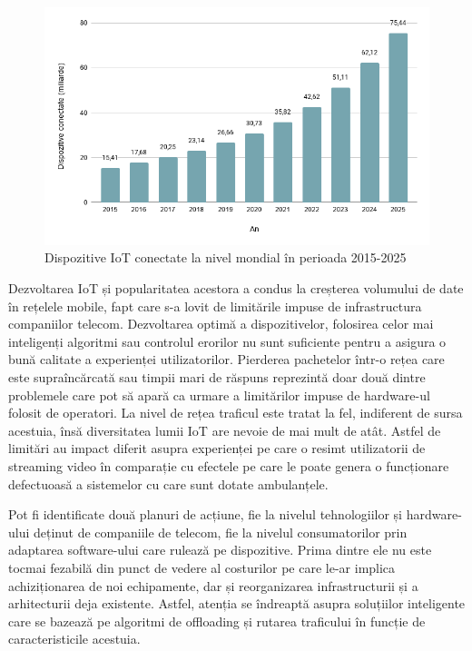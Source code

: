\documentclass[12pt,a4paper]{report}
\begin{document}
\begin{figure}[th]
\centering
\includegraphics[width=\textwidth]{img/IoT_forecast.png}
\caption{Dispozitive IoT conectate la nivel mondial în perioada 2015-2025~\cite{statisca_Iot_forecast}\protect}
\label{fig:IoT_forescat}
\end{figure}

Dezvoltarea IoT și popularitatea acestora a condus la creșterea volumului de date în rețelele mobile, fapt care s-a lovit de limitările impuse de infrastructura companiilor telecom. Dezvoltarea optimă a dispozitivelor, folosirea celor mai inteligenți algoritmi sau controlul erorilor nu sunt suficiente pentru a asigura o bună calitate a experienței utilizatorilor. Pierderea pachetelor într-o rețea care este supraîncărcată sau timpii mari de răspuns reprezintă doar două dintre problemele care pot să apară ca urmare a limitărilor impuse de hardware-ul folosit de operatori. La nivel de rețea traficul este tratat la fel, indiferent de sursa acestuia, însă diversitatea lumii IoT are nevoie de mai mult de atât. Astfel de limitări au impact diferit asupra experienței pe care o resimt utilizatorii de streaming video în comparație cu efectele pe care le poate genera o funcționare defectuoasă a sistemelor cu care sunt dotate ambulanțele.

Pot fi identificate două planuri de acțiune, fie la nivelul tehnologiilor și hardware-ului deținut de companiile de telecom, fie la nivelul consumatorilor prin adaptarea software-ului care rulează pe dispozitive. Prima dintre ele nu este tocmai fezabilă din punct de vedere al costurilor pe care le-ar implica achiziționarea de noi echipamente, dar și reorganizarea infrastructurii și a arhitecturii deja existente. Astfel, atenția se îndreaptă asupra soluțiilor inteligente care se bazează pe algoritmi de offloading și rutarea traficului în funcție de caracteristicile acestuia.
\end{document}
